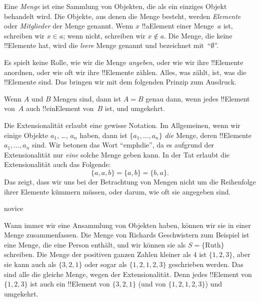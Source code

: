 \documentclass[../../../include/open-logic-section]{subfiles}
\begin{document}

Eine \emph{Menge} ist eine Sammlung von Objekten, die als ein einziges
Objekt behandelt wird. Die Objekte, aus denen die Menge besteht, werden \emph{Elemente} oder
\emph{Mitglieder} der Menge genannt. Wenn $x$ !!a{Element} einer Menge~$a$ ist,
schreiben wir $x \in a$; wenn nicht, schreiben wir $x \notin a$. Die Menge, die keine
!!{Element}e hat, wird die \emph{leere} Menge genannt und
bezeichnet mit~``$\emptyset$''.

\begin{explain}
Es spielt keine Rolle, wie wir die Menge \emph{angeben}, oder wie wir
ihre !!{Element}e anordnen, oder wie oft wir ihre !!{Element}e zählen. Alles, was zählt, ist, was die !!{Element}e
sind. Das bringen wir mit dem folgenden Prinzip zum Ausdruck.
\end{explain}

\begin{defn}[Extensionalität]
  Wenn $A$ und $B$ Mengen sind, dann ist $A = B$ genau dann, wenn
  jedes !!{Element} von~$A$ auch !!ein{Element} von~$B$ ist, und umgekehrt.
\end{defn}

Die Extensionalität erlaubt eine gewisse Notation. Im Allgemeinen, wenn wir einige
Objekte $a_{1}$, \dots, $a_{n}$ haben, dann ist $\{a_{1}, \dots, a_{n}\}$
\emph{die} Menge, deren !!{Element}e $a_1, \dots, a_n$ sind. Wir betonen das Wort ``emph{die}'', da es aufgrund der Extensionalität
nur \emph{eine} solche Menge geben kann. In der Tat erlaubt die Extensionalität auch das
Folgende:
  \[
    \{a, a, b\} = \{a, b\} = \{b,a\}.
  \] 
Das zeigt, dass wir uns bei der Betrachtung von Mengen nicht um die Reihenfolge ihrer Elemente kümmern müssen, oder darum, wie oft sie angegeben sind.

\begin{tagblock}{novice}
\begin{ex}
Wann immer wir eine Ansammlung von Objekten haben, können wir sie in einer Menge zusammenfassen.
 Die Menge von Richards Geschwistern zum Beispiel ist eine Menge, die
eine Person enthält, und wir können sie als $S=\{\textrm{Ruth}\}$ schreiben.
Die Menge der positiven ganzen Zahlen kleiner als $4$ ist $\{1, 2, 3\}$, aber sie
kann auch als $\{3, 2, 1\}$ oder sogar als $\{1, 2, 1, 2, 3\}$ geschrieben werden.
Das sind alle die gleiche Menge, wegen der Extensionalität. Denn jedes !!{Element}
von $\{1, 2, 3\}$ ist auch ein !!{Element} von $\{3, 2, 1\}$ (und von $\{1,
2, 1, 2, 3\}$) und umgekehrt.
\end{ex} 
\end{tagblock}
\end{document}
